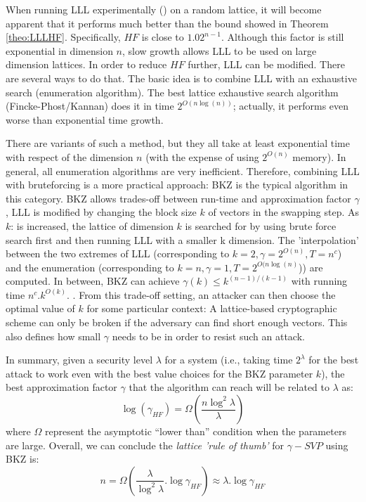 When running LLL experimentally (\cite{nguyen2006lll}) on a random lattice, it will become apparent that it performs much better than the bound showed in Theorem \ref{theo:LLLHF}. Specifically, $HF$
is close to $1.02^{n-1}$. Although this factor is still exponential in dimension
$n$, slow growth allows LLL to be used on large dimension lattices. In
order to reduce $HF$ further, LLL can be modified. There are several
ways to do that. The basic idea is to combine LLL with an exhaustive search
(enumeration algorithm). The best lattice exhaustive search algorithm
(Fincke-Phost/Kannan) does it in time $2^{O(n\log(n))}$; actually, it performs even worse than
exponential time growth. 

There are variants of such a method, but they all take at least
exponential time with respect of the dimension $n$ (with the expense of using $2^{O(n)}$
memory). In general, all enumeration algorithms are very inefficient. Therefore,
combining LLL with bruteforcing is a more practical approach: BKZ is the typical
algorithm in this category.  BKZ allows trades-off between run-time and
approximation factor $\gamma$, LLL is modified by changing the block size $k$ of
vectors in the swapping step. As $k$: is increased, the lattice of
dimension $k$ is searched for by using brute force search first and then running LLL with a smaller k dimension. The 'interpolation' between the two extremes of LLL (corresponding to
$k = 2, \gamma = 2^{O(n)}, T = n^c$) and the enumeration (corresponding to
$k = n, \gamma=1, T = 2^{O(n\log(n)}$)) are computed. In between, BKZ can achieve
$\gamma(k) \leq k^{(n-1)/(k-1)}$ with running time
$n^c.k^{O(k)}$. \cite{hanrot2011terminating}. From this trade-off setting, an
attacker can then choose the optimal value of $k$ for some particular context: A
lattice-based cryptographic scheme can only be broken if the adversary can find
short enough vectors. This also defines how small $\gamma$ needs to be in order
to resist such an attack.

In summary, given a security level $\lambda$ for a system (i.e., taking
time $2^\lambda$ for the best attack to work even with the best value choices for the BKZ
parameter $k$), the best approximation factor $\gamma$ that the
algorithm can reach will be related to $\lambda$ as:
\[
  \log(\gamma_{HF}) = \Omega(\frac{n\log^2\lambda}{\lambda})
\]
where $\Omega$ represent the asymptotic ``lower than'' condition when the parameters
are large. Overall, we can conclude the \emph{lattice 'rule of thumb'} for
$\gamma-SVP$ using BKZ is:
\[
  n = \Omega(\frac{\lambda}{\log^2\lambda}.\log\gamma_{HF}) \approx \lambda
  . \log\gamma_{HF}
\]

